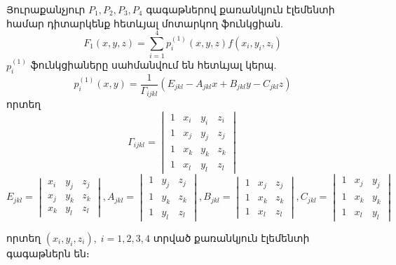 \documentclass[fleqn, bachelor,subf,12pt,notitlepage]{article}
\begin{document}
Յուրաքանչյուր $P_{1}, P_{2}, P_{3}, P_{4}$ գագաթներով քառանկյուն էլեմենտի համար դիտարկենք հետևյալ մոտարկող ֆունկցիան.
\begin{equation}
F_{1}(x, y, z) = \sum_{i=1}^{4} p^{(1)}_{i}(x,y,z)f(x_{i}, y_{i}, z_{i})
\end{equation}
$p^{(1)}_{i}$ ֆունկցիաները սահմանվում են հետևյալ կերպ.
\begin{equation}
p^{(1)}_{i}(x,y) = \dfrac{1}{\Gamma_{ijkl}}\left(E_{jkl} - A_{jkl}x + B_{jkl}y - C_{jkl}z\right)
\end{equation}
որտեղ
\begin{equation}
				\Gamma_{ijkl} = \begin{vmatrix}
										 1 & x_{i} & y_{i} & z_{i} \\
										 1 & x_{j} & y_{j} & z_{j} \\
										 1 & x_{k} & y_{k} & z_{k} \\
										 1 & x_{l} & y_{l} & z_{l}
							\end{vmatrix}
\end{equation}
\begin{equation}
				E_{jkl} = \begin{vmatrix}
										 x_{i} & y_{j} & z_{j} \\
										 x_{j} & y_{k} & z_{k} \\
										 x_{k} & y_{l} & z_{l}
							\end{vmatrix},
				A_{jkl} = \begin{vmatrix}
										 1 & y_{j} & z_{j} \\
										 1 & y_{k} & z_{k} \\
										 1 & y_{l} & z_{l}
							\end{vmatrix},
				B_{jkl} = \begin{vmatrix}
										 1 & x_{j} & z_{j} \\
										 1 & x_{k} & z_{k} \\
										 1 & x_{l} & z_{l}
							\end{vmatrix},
				C_{jkl} = \begin{vmatrix}
										 1 & x_{j} & y_{j} \\
										 1 & x_{k} & y_{k} \\
										 1 & x_{l} & y_{l}
							\end{vmatrix}
\end{equation}

որտեղ $(x_{i}, y_{i}, z_{i}), \; i=1, 2, 3, 4$ տրված քառանկյուն էլեմենտի գագաթներն են։
\end{document}
